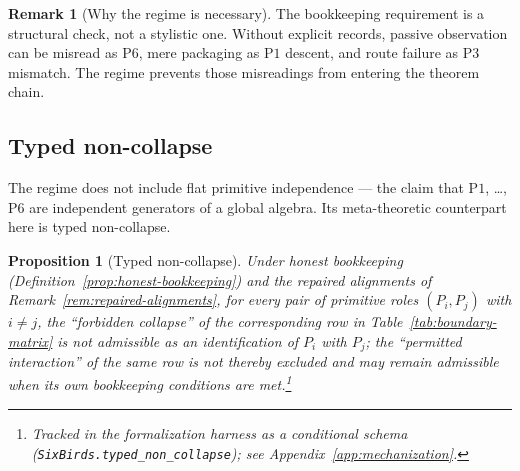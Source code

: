 \documentclass[11pt]{article}
\newtheorem{proposition}[theorem]{Proposition}
\theoremstyle{definition}
\newtheorem{remark}[theorem]{Remark}
\newcommand{\Pone}{\ensuremath{\mathrm{P1}}}
\newcommand{\Pthree}{\ensuremath{\mathrm{P3}}}
\newcommand{\Psix}{\ensuremath{\mathrm{P6}}}
\begin{document}
\begin{remark}[Why the regime is necessary]\label{rem:why-honest-bookkeeping}
The bookkeeping requirement is a structural check, not a stylistic
one. Without explicit records, passive observation can be misread as
\Psix{}, mere packaging as \Pone{} descent, and route failure as
\Pthree{} mismatch. The regime prevents those misreadings from
entering the theorem chain.
\end{remark}


\subsection{Typed non-collapse}\label{subsec:typed-non-collapse}

The regime does not include flat primitive independence --- the claim
that \Pone{}, \ldots, \Psix{} are independent generators of a global
algebra. Its meta-theoretic counterpart here is typed non-collapse.

\begin{proposition}[Typed non-collapse]\label{prop:typed-non-collapse}
Under honest bookkeeping (Definition~\ref{prop:honest-bookkeeping}) and
the repaired alignments of Remark~\ref{rem:repaired-alignments}, for
every pair of primitive roles \((P_i, P_j)\) with \(i \ne j\), the
``forbidden collapse'' of the corresponding row in
Table~\ref{tab:boundary-matrix} is not admissible as an identification
of \(P_i\) with \(P_j\); the ``permitted interaction'' of the same row is
not thereby excluded and may remain admissible when its own bookkeeping
conditions are met.\footnote{Tracked in the formalization harness as a conditional schema (\texttt{SixBirds.typed\_non\_collapse}); see Appendix~\ref{app:mechanization}.}
\end{proposition}
\end{document}
